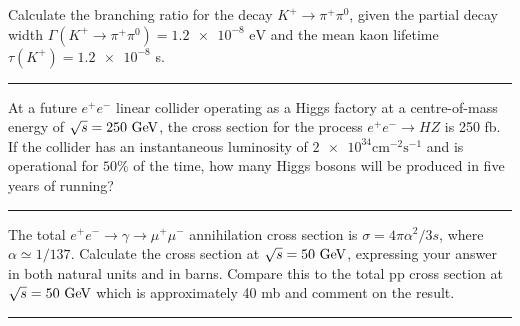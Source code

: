 \begin{problem}{3.3}
Calculate the branching ratio for the decay $K^+\to\pi^+\pi^0$, given the partial decay width $\Gamma(K^+\to\pi^+\pi^0)=\num{1.2e-8} \text{ eV}$
and the mean kaon lifetime $\tau(K^+)=\num{1.2e-8}$ s.
\end{problem}
    
\begin{solution}

    
\end{solution} 
\noindent\rule{7in}{1.5pt}
    

\begin{problem}{3.4}
At a future $e^+e^-$ linear collider operating as a Higgs factory at a centre-of-mass energy of $\sqrt{s}=250\text{ GeV}$, the cross section
for the process $e^+e^-\to HZ$ is 250 fb. If the collider has an instantaneous luminosity of $\num{2e34}\unit{\centi\metre^{-2}\second^{-1}}$
and is operational for $50\%$ of the time, how many Higgs bosons will be produced in five years of running?
\end{problem}
        
\begin{solution}
    
        
\end{solution} 

\noindent\rule{7in}{1.5pt}


\begin{problem}{3.5}
The total $e^+e^-\to\gamma\to\mu^+\mu^-$ annihilation cross section is $\sigma = 4\pi\alpha^2/3s$, where $\alpha \simeq 1/137$. 
Calculate the cross section at $\sqrt{s}=50\text{ GeV}$, expressing your answer in both natural units and in barns.
Compare this to the total pp cross section at $\sqrt{s}=50\text{ GeV}$ which is approximately 40 mb and comment on the result.
\end{problem}
            
\begin{solution}
        
            
\end{solution} 
    
\noindent\rule{7in}{1.5pt}
    


